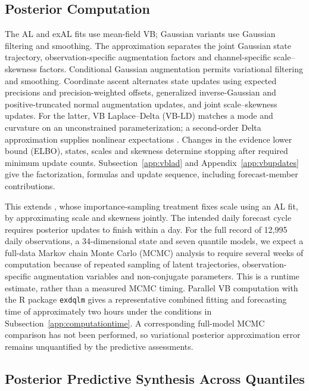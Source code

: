 \documentclass[APA,STIX1COL]{WileyNJD-v2}
\begin{document}
\subsection{Posterior Computation}
\label{subsec:postinf}

The AL and exAL fits use mean-field VB; Gaussian variants use Gaussian filtering and smoothing. The approximation separates the joint Gaussian state trajectory, observation-specific augmentation factors and channel-specific scale--skewness factors. Conditional Gaussian augmentation permits variational filtering and smoothing. Coordinate ascent alternates state updates using expected precisions and precision-weighted offsets, generalized inverse-Gaussian and positive-truncated normal augmentation updates, and joint scale--skewness updates. For the latter, VB Laplace--Delta (VB-LD) matches a mode and curvature on an unconstrained parameterization; a second-order Delta approximation supplies nonlinear expectations \citep{wang2013nonconjugatevb}. Changes in the evidence lower bound (ELBO), states, scales and skewness determine stopping after required minimum update counts. Subsection~\ref{app:vblad} and Appendix~\ref{app:vbupdates} give the factorization, formulas and update sequence, including forecast-member contributions.

This extends \citet{barata2021_flex_quantile}, whose importance-sampling treatment fixes scale using an AL fit, by approximating scale and skewness jointly. The intended daily forecast cycle requires posterior updates to finish within a day. For the full record of 12,995 daily observations, a 34-dimensional state and seven quantile models, we expect a full-data Markov chain Monte Carlo (MCMC) analysis to require several weeks of computation because of repeated sampling of latent trajectories, observation-specific augmentation variables and non-conjugate parameters. This is a runtime estimate, rather than a measured MCMC timing. Parallel VB computation with the R package \texttt{exdqlm} \citep{deleon2026exdqlm} gives a representative combined fitting and forecasting time of approximately two hours under the conditions in Subsection~\ref{app:computationtime}. A corresponding full-model MCMC comparison has not been performed, so variational posterior approximation error remains unquantified by the predictive assessments.

\subsection{Posterior Predictive Synthesis Across Quantiles}
\label{subsec:quantilesynthesis}
\end{document}
